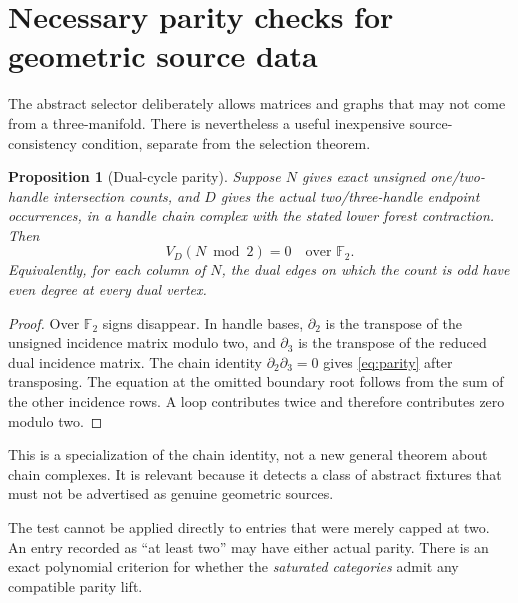 \documentclass[11pt,letterpaper]{article}
\newtheorem{proposition}[theorem]{Proposition}
\theoremstyle{definition}
\newcommand{\F}{\mathbb F}
\begin{document}
\section{Necessary parity checks for geometric source data}\label{sec:parity}
The abstract selector deliberately allows matrices and graphs that may not
come from a three-manifold. There is nevertheless a useful inexpensive
source-consistency condition, separate from the selection theorem.

\begin{proposition}[Dual-cycle parity]\label{prop:parity}
Suppose $N$ gives \emph{exact} unsigned one/two-handle intersection counts,
and $D$ gives the actual two/three-handle endpoint occurrences, in a handle
chain complex with the stated lower forest contraction. Then
\begin{equation}\label{eq:parity}
 V_D (N\bmod2)=0\quad\text{over }\F_2.
\end{equation}
Equivalently, for each column of $N$, the dual edges on which the count is
odd have even degree at every dual vertex.
\end{proposition}
\begin{proof}
Over $\F_2$ signs disappear. In handle bases, $\partial_2$ is the transpose
of the unsigned incidence matrix modulo two, and $\partial_3$ is the
transpose of the reduced dual incidence matrix. The chain identity
$\partial_2\partial_3=0$ gives \eqref{eq:parity} after transposing.
The equation at the omitted boundary root follows from the sum of the
other incidence rows. A loop contributes twice and therefore contributes
zero modulo two.
\end{proof}
This is a specialization of the chain identity, not a new general theorem
about chain complexes. It is relevant because it detects a class of abstract
fixtures that must not be advertised as genuine geometric sources.

The test cannot be applied directly to entries that were merely capped at
two. An entry recorded as ``at least two'' may have either actual parity.
There is an exact polynomial criterion for whether the \emph{saturated
categories} admit any compatible parity lift.
\end{document}
